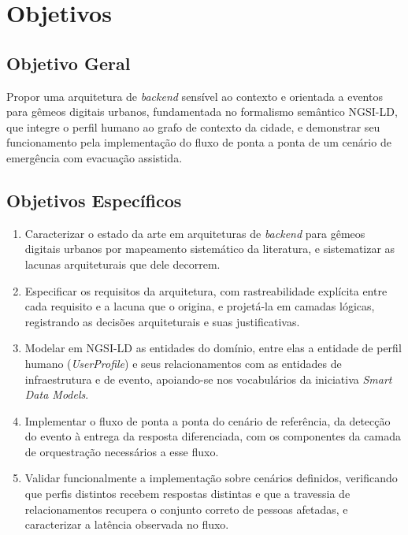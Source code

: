 \section{Objetivos}
\label{sec:objetivos}

\subsection{Objetivo Geral}

Propor uma arquitetura de \textit{backend} sensível ao contexto e orientada a eventos para gêmeos digitais urbanos, fundamentada no formalismo semântico NGSI-LD, que integre o perfil humano ao grafo de contexto da cidade, e demonstrar seu funcionamento pela implementação do fluxo de ponta a ponta de um cenário de emergência com evacuação assistida.

\subsection{Objetivos Específicos}

\begin{enumerate}[label=OE\arabic*.,leftmargin=1.6cm]
	\item Caracterizar o estado da arte em arquiteturas de \textit{backend} para gêmeos digitais urbanos por mapeamento sistemático da literatura, e sistematizar as lacunas arquiteturais que dele decorrem.
	\item Especificar os requisitos da arquitetura, com rastreabilidade explícita entre cada requisito e a lacuna que o origina, e projetá-la em camadas lógicas, registrando as decisões arquiteturais e suas justificativas.
	\item Modelar em NGSI-LD as entidades do domínio, entre elas a entidade de perfil humano (\textit{UserProfile}) e seus relacionamentos com as entidades de infraestrutura e de evento, apoiando-se nos vocabulários da iniciativa \textit{Smart Data Models}.
	\item Implementar o fluxo de ponta a ponta do cenário de referência, da detecção do evento à entrega da resposta diferenciada, com os componentes da camada de orquestração necessários a esse fluxo.
	\item Validar funcionalmente a implementação sobre cenários definidos, verificando que perfis distintos recebem respostas distintas e que a travessia de relacionamentos recupera o conjunto correto de pessoas afetadas, e caracterizar a latência observada no fluxo.
\end{enumerate}

